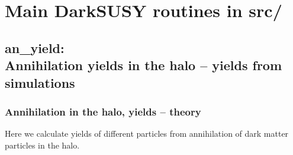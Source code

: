 \documentclass[a4paper,10pt,oneside]{book}
\newcommand{\comment}[1]{}
\newcommand{\codeb}[1]{\ftb{#1}}
\newcommand{\ftb}[1]{{\bfseries \sffamily #1}}
\begin{document}
\part{Main DarkSUSY routines in src/}


\chapter[an\_yield: Annihilation yields in the halo -- yields from simulations]{\codeb{an\_yield}:\\ Annihilation yields in the halo -- yields from simulations}
\label{ch:src/an_yield}

\section{Annihilation in the halo, yields -- theory}

Here we calculate yields of different particles from annihilation of dark matter particles in the halo.


\comment{This description is outdated, and does not really reflect how we do things! So it's commented
out for the moment...}
\end{document}
